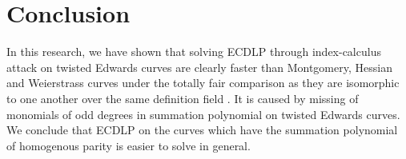\section{Conclusion}
\label{sec:conclusion}

In this research, we have shown that solving ECDLP 
through index-calculus attack on twisted Edwards curves are 
clearly faster than Montgomery, Hessian and Weierstrass curves 
under the totally fair comparison as they are isomorphic 
to one another over the same definition field .
%
It is caused by missing of monomials of odd degrees 
in summation polynomial on twisted Edwards curves.
%
We conclude that ECDLP on the curves which have the 
summation polynomial of homogenous parity is easier to solve
in general.




